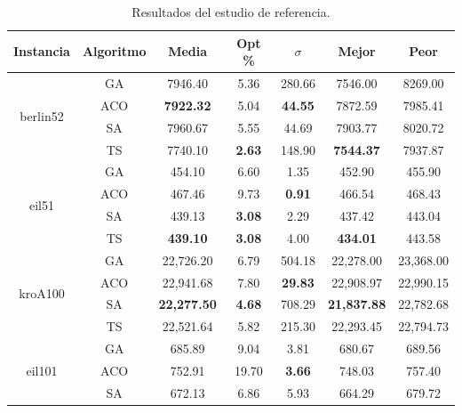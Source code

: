 \begin{table}[H]
    \renewcommand{\arraystretch}{1.3}
    \caption{Resultados del estudio de referencia.}
    \label{tab:ref_results}
    \begin{center}
        \begin{tabular}{|c|c|c|c|c|c|c|}
            \hline
            \textbf{Instancia} & \textbf{Algoritmo} & \textbf{Media} &
            \textbf{Opt \%} & \textbf{$\sigma$} & \textbf{Mejor} &
            \textbf{Peor} \\
            \hline
            \multirow{4}{*}{berlin52} & GA & 7946.40 & 5.36 & 280.66 & 7546.00 & 8269.00 \\
            \cline{2-7}
            & ACO & \textbf{7922.32} & 5.04 & \textbf{44.55} & 7872.59 & 7985.41 \\
            \cline{2-7}
            & SA & 7960.67 & 5.55 & 44.69 & 7903.77 & 8020.72 \\
            \cline{2-7}
            & TS & 7740.10 & \textbf{2.63} & 148.90 & \textbf{7544.37} & 7937.87 \\
            \hline
            \multirow{4}{*}{eil51} & GA & 454.10 & 6.60 & 1.35 & 452.90 & 455.90 \\
            \cline{2-7}
            & ACO & 467.46 & 9.73 & \textbf{0.91} & 466.54 & 468.43 \\
            \cline{2-7}
            & SA & 439.13 & \textbf{3.08} & 2.29 & 437.42 & 443.04 \\
            \cline{2-7}
            & TS & \textbf{439.10} & \textbf{3.08} & 4.00 & \textbf{434.01} & 443.58 \\
            \hline
            \multirow{4}{*}{kroA100} & GA & 22,726.20 & 6.79 & 504.18 & 22,278.00 & 23,368.00 \\
            \cline{2-7}
            & ACO & 22,941.68 & 7.80 & \textbf{29.83} & 22,908.97 & 22,990.15 \\
            \cline{2-7}
            & SA & \textbf{22,277.50} & \textbf{4.68} & 708.29 & \textbf{21,837.88} & 22,782.68 \\
            \cline{2-7}
            & TS & 22,521.64 & 5.82 & 215.30 & 22,293.45 & 22,794.73 \\
            \hline
            \multirow{4}{*}{eil101} & GA & 685.89 & 9.04 & 3.81 & 680.67 & 689.56\\
            \cline{2-7}
            & ACO & 752.91 & 19.70 & \textbf{3.66} & 748.03 & 757.40 \\
            \cline{2-7}
            & SA & 672.13 & 6.86 & 5.93 & 664.29 & 679.72 \\

\end{tabular}
\end{center}
\end{table}
